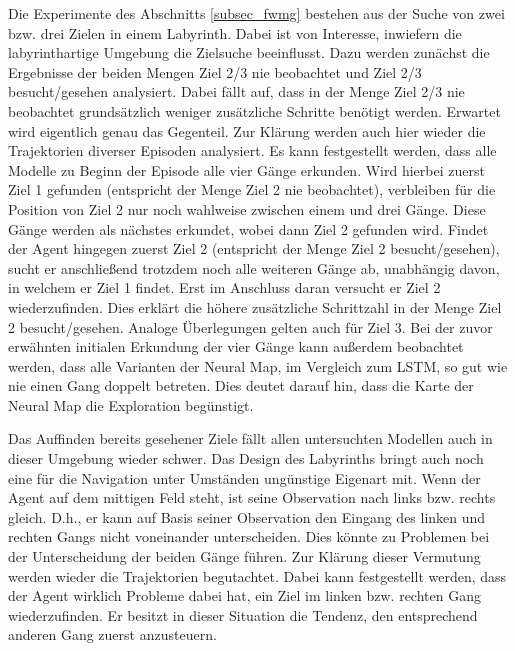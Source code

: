 Die Experimente des Abschnitts \ref{subsec_fwmg} bestehen aus der Suche von zwei bzw. drei Zielen in einem Labyrinth. Dabei ist von Interesse, inwiefern die labyrinthartige Umgebung die Zielsuche beeinflusst. Dazu werden zunächst die Ergebnisse der beiden Mengen \glqq Ziel 2/3 nie beobachtet\grqq{} und \glqq Ziel 2/3 besucht/gesehen\grqq{} analysiert. Dabei fällt auf, dass in der Menge \glqq Ziel 2/3 nie beobachtet\grqq{} grundsätzlich weniger zusätzliche Schritte benötigt werden. Erwartet wird eigentlich genau das Gegenteil. Zur Klärung werden auch hier wieder die Trajektorien diverser Episoden analysiert. Es kann festgestellt werden, dass alle Modelle zu Beginn der Episode alle vier Gänge erkunden. Wird hierbei zuerst Ziel 1 gefunden (entspricht der Menge \glqq Ziel 2 nie beobachtet\grqq{}), verbleiben für die Position von Ziel 2 nur noch wahlweise zwischen einem und drei Gänge. Diese Gänge werden als nächstes erkundet, wobei dann Ziel 2 gefunden wird. Findet der Agent hingegen zuerst Ziel 2 (entspricht der Menge \glqq Ziel 2 besucht/gesehen\grqq{}), sucht er anschließend trotzdem noch alle weiteren Gänge ab, unabhängig davon, in welchem er Ziel 1 findet. Erst im Anschluss daran versucht er Ziel 2 wiederzufinden. Dies erklärt die höhere zusätzliche Schrittzahl in der Menge \glqq Ziel 2 besucht/gesehen\grqq{}. Analoge Überlegungen gelten auch für Ziel 3. Bei der zuvor erwähnten initialen Erkundung der vier Gänge kann außerdem beobachtet werden, dass alle Varianten der Neural Map, im Vergleich zum LSTM, so gut wie nie einen Gang doppelt betreten. Dies deutet darauf hin, dass die Karte der Neural Map die Exploration begünstigt.

Das Auffinden bereits gesehener Ziele fällt allen untersuchten Modellen auch in dieser Umgebung wieder schwer. Das Design des Labyrinths bringt auch noch eine für die Navigation unter Umständen ungünstige Eigenart mit. Wenn der Agent auf dem mittigen Feld steht, ist seine Observation nach links bzw. rechts gleich. D.h., er kann auf Basis seiner Observation den Eingang des linken und rechten Gangs nicht voneinander unterscheiden. Dies könnte zu Problemen bei der Unterscheidung der beiden Gänge führen. Zur Klärung dieser Vermutung werden wieder die Trajektorien begutachtet. Dabei kann festgestellt werden, dass der Agent wirklich Probleme dabei hat, ein Ziel im linken bzw. rechten Gang wiederzufinden. Er besitzt in dieser Situation die Tendenz, den entsprechend anderen Gang zuerst anzusteuern.

